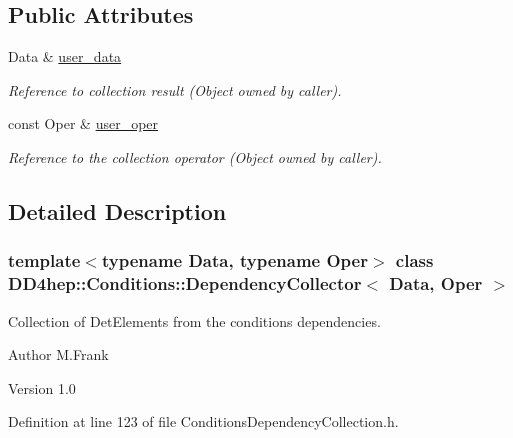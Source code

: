 \subsection*{Public Attributes}
\begin{DoxyCompactItemize}
\item 
Data \& \hyperlink{class_d_d4hep_1_1_conditions_1_1_dependency_collector_a65456b4691406f0da2334732909465a0}{user\_\-data}
\begin{DoxyCompactList}\small\item\em Reference to collection result (Object owned by caller). \item\end{DoxyCompactList}\item 
const Oper \& \hyperlink{class_d_d4hep_1_1_conditions_1_1_dependency_collector_af0056586d4f62f93837c38e0ec32ba5a}{user\_\-oper}
\begin{DoxyCompactList}\small\item\em Reference to the collection operator (Object owned by caller). \item\end{DoxyCompactList}\end{DoxyCompactItemize}


\subsection{Detailed Description}
\subsubsection*{template$<$typename Data, typename Oper$>$ class DD4hep::Conditions::DependencyCollector$<$ Data, Oper $>$}

Collection of DetElements from the conditions dependencies. \begin{DoxyAuthor}{Author}
M.Frank 
\end{DoxyAuthor}
\begin{DoxyVersion}{Version}
1.0 
\end{DoxyVersion}


Definition at line 123 of file ConditionsDependencyCollection.h.


